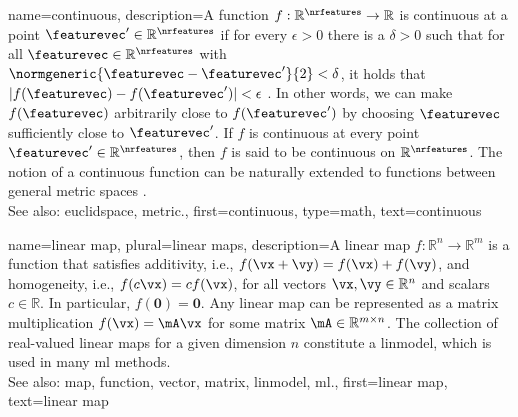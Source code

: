 {name={continuous}, 
description={A \gls{function} $f: \mathbb{R}^{\nrfeatures} \to \mathbb{R}$ is 
	 continuous at a point $\featurevec' \in \mathbb{R}^{\nrfeatures}$ if for 
	 every $\epsilon > 0$ there is a $\delta > 0$ such that for all 
	 $\featurevec \in \mathbb{R}^{\nrfeatures}$ with $\normgeneric{\featurevec - \featurevec'}{2} < \delta$, 
	 it holds that $|f(\featurevec) - f(\featurevec')| < \epsilon$ \cite{RudinBookPrinciplesMatheAnalysis}. 
	 In other words, we can make $f(\featurevec)$ arbitrarily close to $f(\featurevec')$ 
	 by choosing $\featurevec$ sufficiently close to $\featurevec'$. If $f$ is continuous 
	 at every point $\featurevec' \in \mathbb{R}^{\nrfeatures}$, then $f$ is said to be 
	 continuous on $\mathbb{R}^{\nrfeatures}$. The notion of a continuous 
	 \gls{function} can be naturally extended to \glspl{function} between general \gls{metric} 
	 spaces \cite{RudinBookPrinciplesMatheAnalysis}.\\
		See also: \gls{euclidspace}, \gls{metric}.},
	first={continuous},
	type=math,
	text={continuous}
}

{name={linear map}, plural={linear maps}, 
	description={A linear \gls{map} $f: \mathbb{R}^n \rightarrow \mathbb{R}^m$ is a \gls{function} that satisfies additivity, i.e.,
		$f(\vx + \vy) = f(\vx) + f(\vy)$, and homogeneity, i.e.,
		$f(c\vx) = c f(\vx)$, for all \glspl{vector} $\vx, \vy \in \mathbb{R}^n$ and scalars $c \in \mathbb{R}$. 
		In particular, $f(\mathbf{0}) = \mathbf{0}$. Any linear \gls{map} can be represented as a \gls{matrix} 
		multiplication $f(\vx) = \mA \vx$ for some \gls{matrix} $\mA \in \mathbb{R}^{m \times n}$. 
		The collection of real-valued linear \glspl{map} for a given dimension $n$ constitute a \gls{linmodel}, 
		which is used in many \gls{ml} methods.
		\\
		See also: \gls{map}, \gls{function}, \gls{vector}, \gls{matrix}, \gls{linmodel}, \gls{ml}.},
	first={linear map},
	text={linear map}
}

